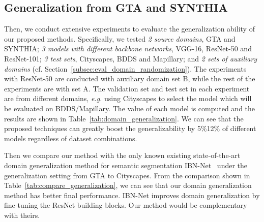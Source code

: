 \documentclass[10pt,twocolumn,letterpaper]{article}
\begin{document}
\begin{table}[t]
{\begin{tabular}{l|l||c|c|c|c}
                                             \hline


\end{tabular}
}

\end{table}




\subsection{Generalization from GTA and SYNTHIA}
\label{subsec:generalization}
Then, we conduct extensive experiments to evaluate the generalization ability of our proposed methods. Specifically, we tested \textit{2 source domains}, GTA and SYNTHIA; \textit{3 models with different backbone networks}, VGG-16, ResNet-50 and ResNet-101; \textit{3 test sets}, Cityscapes, BDDS and Mapillary; and \textit{2 sets of auxiliary domains} (cf. Section~\ref{subsec:eval_domain_randomization}). The experiments with ResNet-50 are conducted with auxiliary domain set B, while the rest of the experiments are with set A. The validation set and test set in each experiment are from different domains, \textit{e.g.} using Cityscapes to select the model which will be evaluated on BDDS/Mapillary. 
The  value of each model is computed and the results are shown in Table~\ref{tab:domain_generalization}. We can see that the proposed techniques can greatly boost the generalizability by 5\%12\% of different models regardless of dataset combinations. 

Then we compare our method with the only known existing state-of-the-art domain generalization method for semantic segmentation IBN-Net~\cite{pan2018twoatonce} under the generalization setting from GTA to Cityscapes. From the comparison shown in Table~\ref{tab:compare_generalization}, we can see that our domain generalization method has better final performance. IBN-Net improves domain generalization by fine-tuning the ResNet building blocks. Our method would be complementary with theirs.
\end{document}
